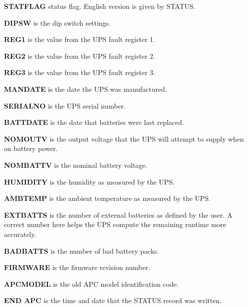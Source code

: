 \begin{description}
\item {\bf STATFLAG}
status flag. English version is given by STATUS.  

\item {\bf DIPSW}
is the dip switch settings.  

\item {\bf REG1}
is the value from the UPS fault register 1.  

\item {\bf REG2}
is the value from the UPS fault register 2.  

\item {\bf REG3}
is the value from the UPS fault register 3.  

\item {\bf MANDATE}
is the date the UPS was manufactured.  

\item {\bf SERIALNO}
is the UPS serial number.  

\item {\bf BATTDATE}
is the date that batteries were last replaced.  

\item {\bf NOMOUTV}
is the output voltage that the UPS will attempt to supply when on battery
power.  

\item {\bf NOMBATTV}
is the nominal battery voltage.  

\item {\bf HUMIDITY}
is the humidity as measured by the UPS.  

\item {\bf AMBTEMP}
is the ambient temperature as measured by the UPS.  

\item {\bf EXTBATTS}
is the number of external batteries as defined by the user. A correct number
here helps the UPS compute the remaining runtime more accurately.  

\item {\bf BADBATTS}
is the number of bad battery packs.  

\item {\bf FIRMWARE}
is the firmware revision number.  

\item {\bf APCMODEL}
is the old APC model identification code.  

\item {\bf END APC}
is the time and date that the STATUS record was written. 
\end{description}

